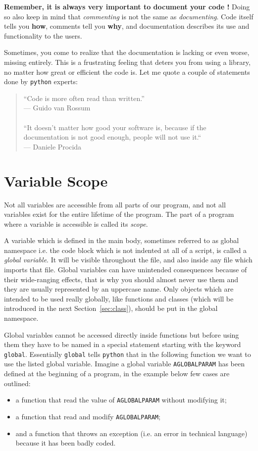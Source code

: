 \textbf{Remember, it is always very important to document your code !} Doing so also keep in mind that \emph{commenting} is not the same as \emph{documenting}. Code itself tells you \textbf{how}, comments tell you \textbf{why}, and documentation describes its use and functionality to the users.

Sometimes, you come to realize that the documentation is lacking or even worse, missing entirely. This is a frustrating feeling that deters you from using a library, no matter how great or efficient the code is.
Let me quote a couple of statements done by \texttt{python} experts:
\begin{quote}
“Code is more often read than written.”\\
\null\hfill— Guido van Rossum
\\\\
“It doesn’t matter how good your software is, because if the documentation is not good enough, people will not use it.“\\
\null\hfill— Daniele Procida
\end{quote}

\section{Variable Scope}
\label{sec:var_scope}

Not all variables are accessible from all parts of our program, and not all variables exist for the entire lifetime of the program. The part of a program where a variable is accessible is called its \emph{scope}.

A variable which is defined in the main body, sometimes referred to as global namespace i.e. the code block which is not indented at all of a script, is called a \emph{global variable}. It will be visible throughout the file, and also inside any file which imports that file. Global variables can have unintended consequences because of their wide-ranging effects, that is why you should almost never use them and they are usually represented by an uppercase name. Only objects which are intended to be used really globally, like functions and classes (which will be introduced in the next Section~\ref{sec:class}), should be put in the global namespace.

Global variables cannot be accessed directly inside functions but before using them they have to be named in a special statement starting with the keyword \texttt{global}. Essentially \texttt{global} tells \texttt{python} that in the following function we want to use the listed global variable.
Imagine a global variable \texttt{AGLOBALPARAM} has been defined at the beginning of a program, 
in the example below few cases are outlined:
\begin {itemize}
\tightlist
\item a function that read the value of \texttt{AGLOBALPARAM} without modifying it;
\item a function that read and modify \texttt{AGLOBALPARAM};
\item and a function that throws an exception (i.e. an error in technical language) because it has been badly coded.
\end{itemize}

